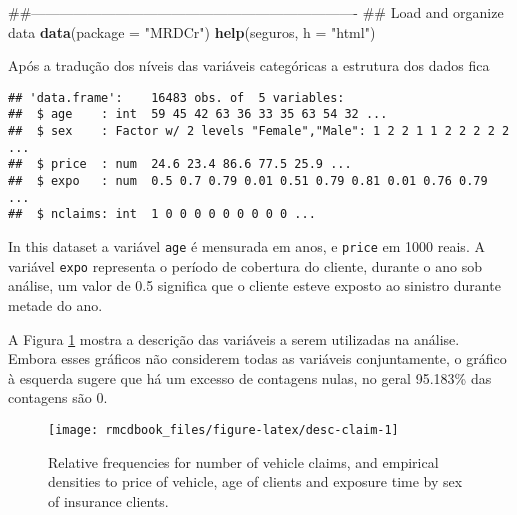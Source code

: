 \documentclass[9pt,a5paper,]{book}
\newenvironment{Shaded}{}{}
\newcommand{\KeywordTok}[1]{\textbf{{#1}}}
\newcommand{\DataTypeTok}[1]{\underline{{#1}}}
\newcommand{\StringTok}[1]{{#1}}
\newcommand{\NormalTok}[1]{{#1}}
\renewenvironment{Shaded}{\color{inputcolor}}{}
\renewcommand{\DataTypeTok}[1]{{#1}}
\theoremstyle{definition}
\theoremstyle{definition}
\theoremstyle{remark}
\begin{document}
\begin{Shaded}
\begin{Highlighting}[]
\NormalTok{##----------------------------------------------------------------------}
\NormalTok{## Load and organize data}
\KeywordTok{data}\NormalTok{(}\DataTypeTok{package =} \StringTok{"MRDCr"}\NormalTok{)}
\KeywordTok{help}\NormalTok{(seguros, }\DataTypeTok{h =} \StringTok{"html"}\NormalTok{)}
\end{Highlighting}
\end{Shaded}

Após a tradução dos níveis das variáveis categóricas a estrutura dos
dados fica

\begin{Shaded}
\end{Shaded}

\begin{verbatim}
## 'data.frame':    16483 obs. of  5 variables:
##  $ age    : int  59 45 42 63 36 33 35 63 54 32 ...
##  $ sex    : Factor w/ 2 levels "Female","Male": 1 2 2 1 1 2 2 2 2 2 ...
##  $ price  : num  24.6 23.4 86.6 77.5 25.9 ...
##  $ expo   : num  0.5 0.7 0.79 0.01 0.51 0.79 0.81 0.01 0.76 0.79 ...
##  $ nclaims: int  1 0 0 0 0 0 0 0 0 0 ...
\end{verbatim}

In this dataset a variável \texttt{age} é mensurada em anos, e
\texttt{price} em 1000 reais. A variável \texttt{expo} representa o
período de cobertura do cliente, durante o ano sob análise, um valor de
0.5 significa que o cliente esteve exposto ao sinistro durante metade do
ano.

A Figura \ref{fig:desc-claim} mostra a descrição das variáveis a serem
utilizadas na análise. Embora esses gráficos não considerem todas as
variáveis conjuntamente, o gráfico à esquerda sugere que há um excesso
de contagens nulas, no geral 95.183\% das contagens são 0.

\begin{figure}[h]

{\centering \texttt{[image: rmcdbook\_files/figure-latex/desc-claim-1]} 

}

\caption{Relative frequencies for number of vehicle claims, and empirical densities to price of vehicle, age of clients and exposure time by sex of insurance clients.}\label{fig:desc-claim}
\end{figure}
\end{document}
